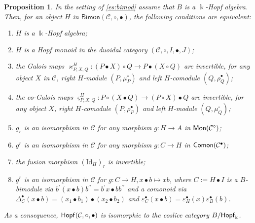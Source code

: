 \documentclass[nosumlimits,twoside]{amsart}
\newtheorem{proposition}[proposition]{\sc Proposition}
\theoremstyle{definition}
\theoremstyle{remark}
\newcommand{\rd}[1]{{\color{red}{#1}}}
\newcommand{\id}{\mathrm{Id}}
\newcommand{\Cc}{\mathcal{C}}
\def\Comon{{\sf Comon}}
\def\Mon{{\sf Mon}}
\def\Hopfmon{{\sf Hopf}}
\begin{document}
\begin{proposition}%
\label{pro:Bohm}
In the setting of
\cref{es:bimod} assume that $B$ is a $\Bbbk$-Hopf algebra.
 Then, for an object $H$ in $\mathsf{Bimon}(\Cc,\circ,\bullet)$,
 the following conditions are equivalent:
\begin{enumerate}
    \item $H$ is a $\Bbbk$-Hopf algebra;
     \item $H$ is a Hopf monoid in the duoidal category $(\Cc,\circ,I,\bullet,J)$;
     \item the Galois maps
 $\varkappa _{P,X,Q}^{H} :(P\bullet X)\circ Q\to P\bullet (X\circ Q)$
    are invertible, for any object $X$ in $\Cc$,  right $H$-module $\left( P,\mu^\circ _{P}\right) $ and left $H$-comodule $\left( Q,\rho^\bullet _{Q}\right)$;
      \item the co-Galois maps
$\varsigma _{P,X,Q}^{H}:P\circ (X\bullet Q)\to (P\circ X)\bullet Q$
    are invertible, for any object $X$, right $H$-comodule $\left( P,\rho^\bullet _{P}\right) $ and left $H$-module $\left( Q,\mu^\circ _{Q}\right) $;
    \item $g_r$ is an isomorphism in $\Cc$ for any morphism $g:H\to A$ in $\Mon(\Cc^\circ)$;
    \item $g^r$ is an isomorphism in $\Cc$ for any morphism $g:C\to H$ in $\Comon(\Cc^\bullet)$;
     \item the fusion morphism $(\id_H)_r$ is invertible;
    \item $g^r$ is an isomorphism in $\Cc$ for $g:C\to H,x\bullet b\mapsto xb$, where $C:=H\bullet I$ is a $B$-bimodule via $b^{\prime }\left( x\bullet b\right) b^{\prime \prime }=b^{\prime
}x\bullet bb^{\prime \prime }$ and a comonoid via $\Delta_C^\bullet(x\bullet b)=(x_1\bullet b_1)\bullet (x_2\bullet b_2)$ and $\varepsilon_C^\bullet(x\bullet b)=\varepsilon_H^\bullet(x)\varepsilon_B^\bullet(b)$.
\end{enumerate}
As a consequence,  $\Hopfmon(\Cc,\circ,\bullet)$ is isomorphic to the coslice category $B/\Hopfmon_\Bbbk$.
\end{proposition}
\end{document}

